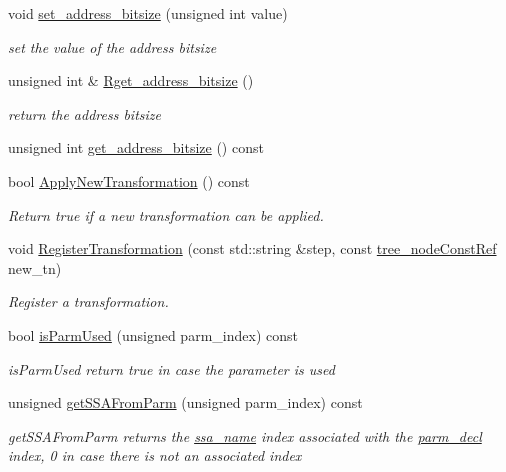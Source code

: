 \begin{DoxyCompactItemize}
void \hyperlink{classapplication__manager_a492bb69928f8fcc21ca0b4c3d19dd45c}{set\+\_\+address\+\_\+bitsize} (unsigned int value)
\begin{DoxyCompactList}\small\item\em set the value of the address bitsize \end{DoxyCompactList}\item 
unsigned int \& \hyperlink{classapplication__manager_a1a6316f5547af7a16324968df759997c}{Rget\+\_\+address\+\_\+bitsize} ()
\begin{DoxyCompactList}\small\item\em return the address bitsize \end{DoxyCompactList}\item 
unsigned int \hyperlink{classapplication__manager_a1edba5434f8e815cf9339be509af0d52}{get\+\_\+address\+\_\+bitsize} () const
\item 
bool \hyperlink{classapplication__manager_a915cefdfbd50a26581c5ac028884cf6b}{Apply\+New\+Transformation} () const
\begin{DoxyCompactList}\small\item\em Return true if a new transformation can be applied. \end{DoxyCompactList}\item 
void \hyperlink{classapplication__manager_afd61443628a45c82ceb70e96f5b8f51c}{Register\+Transformation} (const std\+::string \&step, const \hyperlink{tree__node_8hpp_a3cf5d02292c940f3892425a5b5fdec3c}{tree\+\_\+node\+Const\+Ref} new\+\_\+tn)
\begin{DoxyCompactList}\small\item\em Register a transformation. \end{DoxyCompactList}\item 
bool \hyperlink{classapplication__manager_a98f01e0832d7103f7c51d7d689bc8daf}{is\+Parm\+Used} (unsigned parm\+\_\+index) const
\begin{DoxyCompactList}\small\item\em is\+Parm\+Used return true in case the parameter is used \end{DoxyCompactList}\item 
unsigned \hyperlink{classapplication__manager_ae5944dcfaf586cd7109e762136f29a43}{get\+S\+S\+A\+From\+Parm} (unsigned parm\+\_\+index) const
\begin{DoxyCompactList}\small\item\em get\+S\+S\+A\+From\+Parm returns the \hyperlink{structssa__name}{ssa\+\_\+name} index associated with the \hyperlink{structparm__decl}{parm\+\_\+decl} index, 0 in case there is not an associated index \end{DoxyCompactList}\item 

\end{DoxyCompactItemize}
